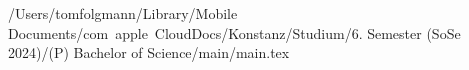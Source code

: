 /Users/tomfolgmann/Library/Mobile Documents/com~apple~CloudDocs/Konstanz/Studium/6. Semester (SoSe 2024)/(P) Bachelor of Science/main/main.tex